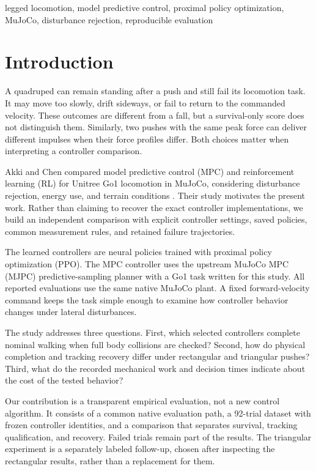 \documentclass[conference]{IEEEtran}
\begin{document}
\begin{IEEEkeywords}
legged locomotion, model predictive control, proximal policy optimization, MuJoCo, disturbance rejection, reproducible evaluation
\end{IEEEkeywords}

\section{Introduction}

A quadruped can remain standing after a push and still fail its locomotion task. It may move too slowly, drift sideways, or fail to return to the commanded velocity. These outcomes are different from a fall, but a survival-only score does not distinguish them. Similarly, two pushes with the same peak force can deliver different impulses when their force profiles differ. Both choices matter when interpreting a controller comparison.

Akki and Chen compared model predictive control (MPC) and reinforcement learning (RL) for Unitree Go1 locomotion in MuJoCo, considering disturbance rejection, energy use, and terrain conditions \cite{akki2025}. Their study motivates the present work. Rather than claiming to recover the exact controller implementations, we build an independent comparison with explicit controller settings, saved policies, common measurement rules, and retained failure trajectories.

The learned controllers are neural policies trained with proximal policy optimization (PPO). The MPC controller uses the upstream MuJoCo MPC (MJPC) predictive-sampling planner with a Go1 task written for this study. All reported evaluations use the same native MuJoCo plant. A fixed forward-velocity command keeps the task simple enough to examine how controller behavior changes under lateral disturbances.

The study addresses three questions. First, which selected controllers complete nominal walking when full body collisions are checked? Second, how do physical completion and tracking recovery differ under rectangular and triangular pushes? Third, what do the recorded mechanical work and decision times indicate about the cost of the tested behavior?

Our contribution is a transparent empirical evaluation, not a new control algorithm. It consists of a common native evaluation path, a 92-trial dataset with frozen controller identities, and a comparison that separates survival, tracking qualification, and recovery. Failed trials remain part of the results. The triangular experiment is a separately labeled follow-up, chosen after inspecting the rectangular results, rather than a replacement for them.
\end{document}
